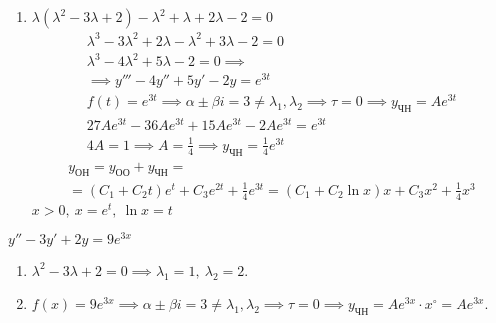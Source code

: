 \begin{example}
\begin{enumerate}
        \item $\lambda(\lambda^2 - 3\lambda + 2) - \lambda^2 + \lambda + 2\lambda -2 = 0$
              \begin{align*}
                  \lambda^3 - 3\lambda^2 + 2\lambda - \lambda^2 + 3\lambda - 2 = 0                                                         \\
                  \lambda^3 - 4\lambda^2 + 5\lambda - 2 = 0 \implies                                                                       \\
                  \implies y''' - 4y'' + 5y' - 2y = e^{3t}                                                                                 \\
                  f(t) = e^{3t} \implies \alpha \pm \beta i = 3 \ne \lambda_1,\lambda_2 \implies \tau = 0 \implies y_{\text{ЧН}} = Ae^{3t} \\
                  27Ae^{3t} - 36Ae^{3t} + 15Ae^{3t} - 2Ae^{3t} = e^{3t}                                                                    \\
                  4A = 1 \implies A = \frac{1}{4} \implies y_{\text{ЧН}} = \frac{1}{4}e^{3t}
              \end{align*}
              \begin{multline*}
                  y_{\text{ОН}} = y_{\text{ОО}} + y_{\text{ЧН}} = \\
                  = (C_1 + C_2t)e^t + C_3e^{2t} + \frac{1}{4}e^{3t} = (C_1 + C_2\ln x)x + C_3x^2 + \frac{1}{4}x^3
              \end{multline*}
              $x > 0, \ x = e^t, \ \ln x = t$
    \end{enumerate}
\end{example}

\begin{example}
    $y'' - 3y' + 2y = 9e^{3x}$
    \begin{enumerate}
        \item $\lambda^2 - 3\lambda + 2 = 0 \implies \lambda_1 = 1, \ \lambda_2 = 2$.
        \item $f(x) = 9e^{3x} \implies \alpha \pm \beta i = 3 \ne \lambda_1, \lambda_2 \implies \tau = 0 \implies y_{\text{ЧН}} = Ae^{3x}\cdot x^\circ = Ae^{3x}$.
    \end{enumerate}
\end{example}

